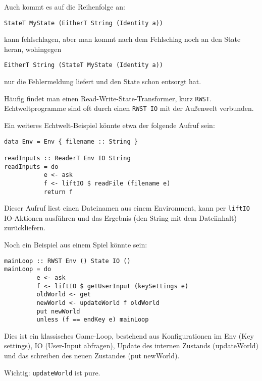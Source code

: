 \documentclass{beamer}
\begin{document}
\begin{frame}[fragile]
Auch kommt es auf die Reihenfolge an:
\begin{verbatim}
StateT MyState (EitherT String (Identity a))
\end{verbatim}
kann fehlschlagen, aber man kommt nach dem Fehlschlag noch an den State heran\pause, wohingegen
\begin{verbatim}
EitherT String (StateT MyState (Identity a))
\end{verbatim}
nur die Fehlermeldung liefert und den State schon entsorgt hat.\\\par
\pause
Häufig findet man einen Read-Write-State-Transformer, kurz \texttt{RWST}.\\
\pause
Echtweltprogramme sind oft durch einen \texttt{RWST IO} mit der Außenwelt verbunden.
\end{frame}

\begin{frame}[fragile]
Ein weiteres Echtwelt-Beispiel könnte etwa der folgende Aufruf sein:
\begin{verbatim}
data Env = Env { filename :: String }

readInputs :: ReaderT Env IO String
readInputs = do
           e <- ask
           f <- liftIO $ readFile (filename e)
           return f
\end{verbatim}
\pause
Dieser Aufruf liest einen Dateinamen aus einem Environment, kann per \texttt{liftIO} IO-Aktionen ausführen und das Ergebnis (den String mit dem Dateiinhalt) zurückliefern.
\end{frame}

\begin{frame}[fragile]
Noch ein Beispiel aus einem Spiel könnte sein:
\begin{verbatim}
mainLoop :: RWST Env () State IO ()
mainLoop = do
         e <- ask
         f <- liftIO $ getUserInput (keySettings e)
         oldWorld <- get
         newWorld <- updateWorld f oldWorld
         put newWorld
         unless (f == endKey e) mainLoop
\end{verbatim}
\pause
Dies ist ein klassisches Game-Loop, bestehend aus Konfigurationen im Env (Key settings), IO (User-Input abfragen), Update des internen Zustands (updateWorld) und das schreiben des neuen Zustandes (put newWorld).\par
\pause
Wichtig: \texttt{updateWorld} ist pure.
\end{frame}
\end{document}
